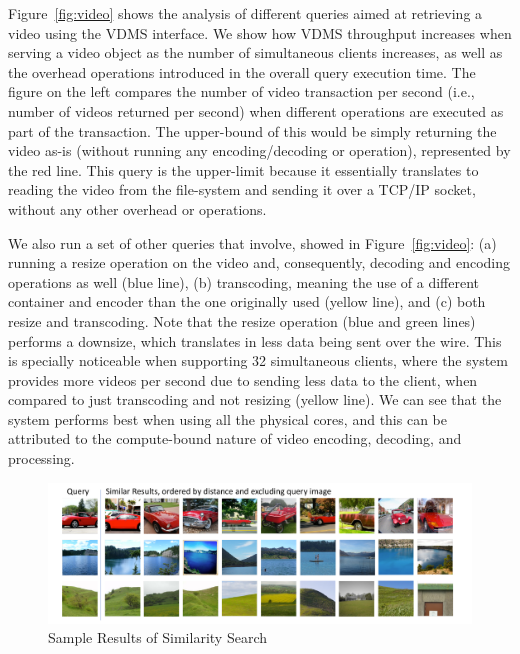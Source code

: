 Figure~\ref{fig:video} shows the analysis of different queries aimed
at retrieving a video using the VDMS interface.
We show how VDMS throughput increases when serving
a video object as the number of simultaneous clients increases, as well as the
overhead operations introduced in the overall query execution time.
The figure on the left compares the number of video transaction per second
(i.e., number of videos returned per second) when different operations
are executed as part of the transaction. The upper-bound of this would be
simply returning the video as-is (without running any encoding/decoding or
operation), represented by the red line. This query is the upper-limit because
it essentially translates to reading the video from the file-system and sending
it over a TCP/IP socket, without any other overhead or operations.

We also run a set of other queries that involve, showed in Figure~\ref{fig:video}:
(a) running a resize operation on the video and, consequently,
decoding and encoding operations as well (blue line),
(b) transcoding, meaning the use of a different container and encoder
than the one originally used (yellow line), and
(c) both resize and transcoding.
Note that the resize operation (blue and green lines) performs a downsize,
which translates in less data being sent over the wire.
This is specially noticeable when supporting 32 simultaneous clients, 
where the system provides more videos per second due to sending less data to 
the client, when compared to just transcoding and not resizing (yellow line).
We can see that the system performs best when using all the physical cores,
and this can be attributed to the compute-bound nature of video
encoding, decoding, and processing.

\begin{figure}[ht!]
\centering
\includegraphics[width=\textwidth]{figures/feature_img_results}
\caption{Sample Results of Similarity Search}
\label{fig:similarity}
\end{figure}

